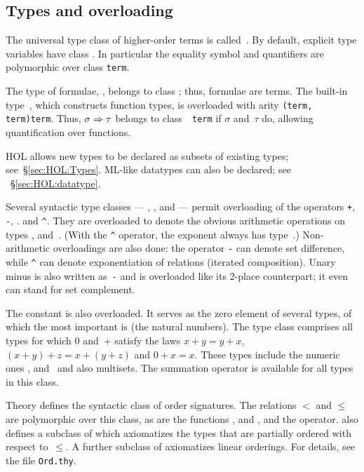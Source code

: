 \subsection{Types and overloading}
The universal type class of higher-order terms is called~.
By default, explicit type variables have class .  In
particular the equality symbol and quantifiers are polymorphic over
class \texttt{term}.

The type of formulae, , belongs to class ; thus,
formulae are terms.  The built-in type~, which constructs
function types, is overloaded with arity {\tt(term,\thinspace
  term)\thinspace term}.  Thus, $\sigma\Rightarrow\tau$ belongs to class~{\tt
  term} if $\sigma$ and~$\tau$ do, allowing quantification over
functions.

HOL allows new types to be declared as subsets of existing types;
see~{\S}\ref{sec:HOL:Types}.  ML-like datatypes can also be declared; see
~{\S}\ref{sec:HOL:datatype}.

Several syntactic type classes --- , ,
 and
 --- permit overloading of the operators {\tt+}, {\tt-}, {\tt*}. 
and \verb|^|. 
%
They are overloaded to denote the obvious arithmetic operations on types
,  and~. (With the \verb|^| operator, the
exponent always has type~.)  Non-arithmetic overloadings are also
done: the operator {\tt-} can denote set difference, while \verb|^| can
denote exponentiation of relations (iterated composition).  Unary minus is
also written as~{\tt-} and is overloaded like its 2-place counterpart; it even
can stand for set complement.

The constant  is also overloaded.  It serves as the zero element of
several types, of which the most important is  (the natural
numbers).  The type class  comprises all types for which 0
and~+ satisfy the laws $x+y=y+x$, $(x+y)+z = x+(y+z)$ and $0+x = x$.  These
types include the numeric ones ,  and~ and also
multisets.  The summation operator  is available for all types in
this class. 

Theory  defines the syntactic class  of order
signatures.  The relations $<$ and $\leq$ are polymorphic over this
class, as are the functions ,  and , and
the  operator.  also defines a subclass
 of  which axiomatizes the types that are partially
ordered with respect to~$\leq$.  A further subclass  of
 axiomatizes linear orderings.
For details, see the file \texttt{Ord.thy}.
                                          
